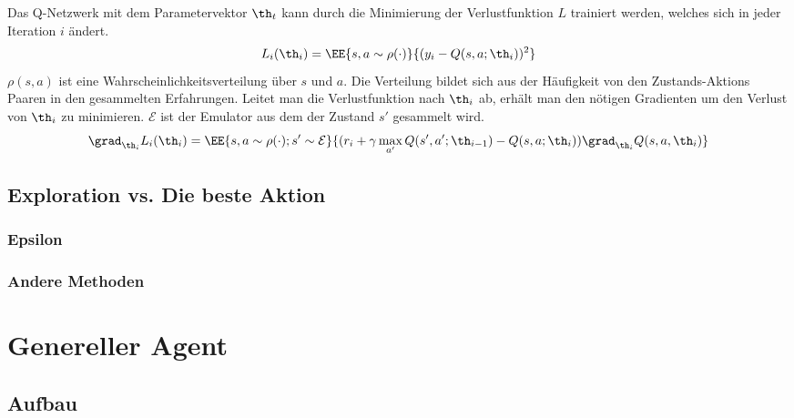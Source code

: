 \documentclass[a4paper,titlepage]{article}
\numberwithin{equation}{section} %
\begin{document}
{Das Q-Netzwerk mit dem Parametervektor $\th_t$ kann durch die Minimierung der Verlustfunktion $L$ trainiert werden, welches sich in jeder Iteration $i$ ändert.
\begin{equation}
	L_i(\th_i) = \EE{s,a\sim \rho(\cdot)}{(y_i - Q(s,a;\th_i))^2}
\end{equation}
$\rho(s, a)$ ist eine Wahrscheinlichkeitsverteilung über $s$ und $a$. Die Verteilung bildet sich aus der Häufigkeit von den Zustands-Aktions Paaren in den gesammelten Erfahrungen. Leitet man die Verlustfunktion nach $\th_i$ ab, erhält man den nötigen Gradienten um den Verlust von $\th_i$ zu minimieren. $\mathcal{E}$ ist der Emulator aus dem der Zustand $s'$ gesammelt wird.
\begin{equation}
	\grad_{\th_i}L_i(\th_i) = \EE{s,a\sim \rho(\cdot);s'\sim\mathcal{E}}{(r_i + \gamma \max_{a'}Q(s', a';\th_{i-1}) - Q(s,a;\th_i))\grad_{\th_i}Q(s,a,\th_i)}
\end{equation}


\subsection{Exploration vs. Die beste Aktion}

\subsubsection{Epsilon}

\subsubsection{Andere Methoden}


\newpage

\section{Genereller Agent}


\subsection{Aufbau}

}
\end{document}
